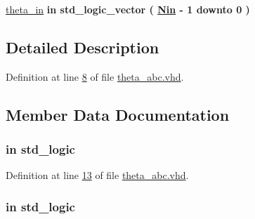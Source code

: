 \begin{DoxyCompactItemize}
\item 
\hyperlink{classtheta__abc_aa0a6389197d6e4203cf6b365fbe2e2d1}{theta\+\_\+in}  {\bfseries {\bfseries \textcolor{keywordflow}{in}\textcolor{vhdlchar}{ }}} {\bfseries \textcolor{comment}{std\+\_\+logic\+\_\+vector}\textcolor{vhdlchar}{ }\textcolor{vhdlchar}{(}\textcolor{vhdlchar}{ }\textcolor{vhdlchar}{ }\textcolor{vhdlchar}{ }\textcolor{vhdlchar}{ }{\bfseries \hyperlink{classtheta__abc_a81567f92ddcbd14c6385d610a895f134}{Nin}} \textcolor{vhdlchar}{-\/}\textcolor{vhdlchar}{ } \textcolor{vhdldigit}{1} \textcolor{vhdlchar}{ }\textcolor{keywordflow}{downto}\textcolor{vhdlchar}{ }\textcolor{vhdlchar}{ } \textcolor{vhdldigit}{0} \textcolor{vhdlchar}{ }\textcolor{vhdlchar}{)}\textcolor{vhdlchar}{ }} 
\end{DoxyCompactItemize}


\subsection{Detailed Description}


Definition at line \hyperlink{theta__abc_8vhd_source_l00008}{8} of file \hyperlink{theta__abc_8vhd_source}{theta\+\_\+abc.\+vhd}.



\subsection{Member Data Documentation}
\hypertarget{classtheta__abc_a4a4609c199d30b3adebbeb3a01276ec5}{}
\subsubsection[{clk}]{ {\bfseries \textcolor{keywordflow}{in}\textcolor{vhdlchar}{ }} {\bfseries \textcolor{comment}{std\+\_\+logic}\textcolor{vhdlchar}{ }} \hspace{0.3cm}{\ttfamily [Port]}}\label{classtheta__abc_a4a4609c199d30b3adebbeb3a01276ec5}


Definition at line \hyperlink{theta__abc_8vhd_source_l00013}{13} of file \hyperlink{theta__abc_8vhd_source}{theta\+\_\+abc.\+vhd}.

\hypertarget{classtheta__abc_adcf9c6f5161d039addbda5819bee64a3}{}
\subsubsection[{en}]{ {\bfseries \textcolor{keywordflow}{in}\textcolor{vhdlchar}{ }} {\bfseries \textcolor{comment}{std\+\_\+logic}\textcolor{vhdlchar}{ }} \hspace{0.3cm}{\ttfamily [Port]}}\label{classtheta__abc_adcf9c6f5161d039addbda5819bee64a3}


